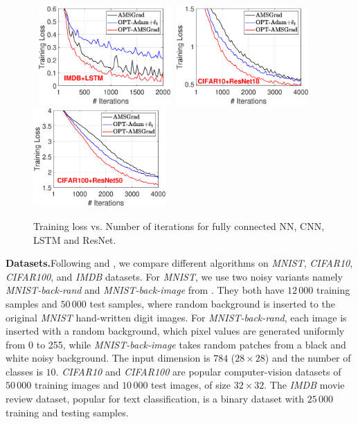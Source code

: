 \documentclass[wcp]{jmlr}
\begin{document}
\begin{figure}[t]
\mbox{\hspace{-0.2in}
\includegraphics[width=2.0in]{simulation/fig2/imdb_lstm_train_loss_no1.eps}\hspace{-0.1in}
\includegraphics[width=2.0in]{simulation/fig2/cifar10_resnet_train_loss.eps}\hspace{-0.1in}
\includegraphics[width=2.0in]{simulation/fig2/cifar100_resnet_train_loss.eps}
}
\caption{Training loss vs. Number of iterations for fully connected NN, CNN, LSTM and ResNet.}
\label{fig:train_loss}\vspace{-0.05in}
\end{figure}

\textbf{Datasets.}\hspace{0.1in}Following \cite{RKK18} and \cite{KB15}, we compare different algorithms on \textit{MNIST}, \textit{CIFAR10},
\textit{CIFAR100}, and \textit{IMDB} datasets. 
For \textit{MNIST}, we use two noisy variants namely \textit{MNIST-back-rand} and \textit{MNIST-back-image} from \cite{MNIST07}. 
They both have $12\,000$ training samples and $50\,000$ test samples, where random background is inserted to the original \textit{MNIST} hand-written digit images. 
For \textit{MNIST-back-rand}, each image is inserted with a random background, which pixel values are generated uniformly from 0 to 255, while \textit{MNIST-back-image} takes random patches from a black and white noisy background.
The input dimension is $784$ ($28\times 28$) and the number of classes is $10$. 
\textit{CIFAR10} and \textit{CIFAR100} are popular computer-vision datasets of $50\,000$ training images and $10\,000$ test images, of size $32\times 32$. 
The \textit{IMDB} movie review dataset, popular for text classification, is a binary dataset with $25\,000$ training and testing samples. 
\end{document}
